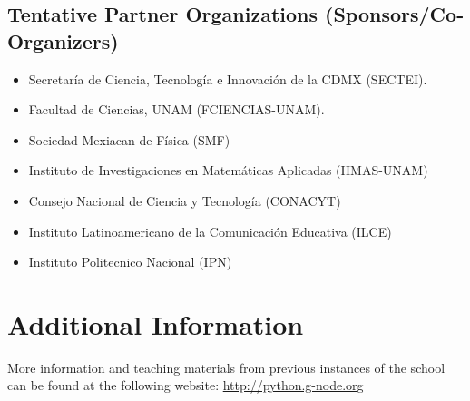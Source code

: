\documentclass{article}[11pt]
\begin{document}
\subsection*{Tentative Partner Organizations (Sponsors/Co-Organizers)}
\begin{itemize}
    \item Secretar\'ia de Ciencia, Tecnolog\'ia e Innovaci\'on de la CDMX
    (SECTEI).
    \item Facultad de Ciencias, UNAM (FCIENCIAS-UNAM).
    \item Sociedad Mexiacan de F\'isica (SMF)
    \item Instituto de Investigaciones en Matem\'aticas Aplicadas (IIMAS-UNAM)
    \item Consejo Nacional de Ciencia y Tecnolog\'ia (CONACYT)
    \item Instituto Latinoamericano de la Comunicaci\'on Educativa (ILCE)
    \item Instituto Politecnico Nacional (IPN)
\end{itemize}

\section*{Additional Information}
More information and teaching materials from previous instances of the school
can be found at the following website: \url{http://python.g-node.org}
\end{document}
